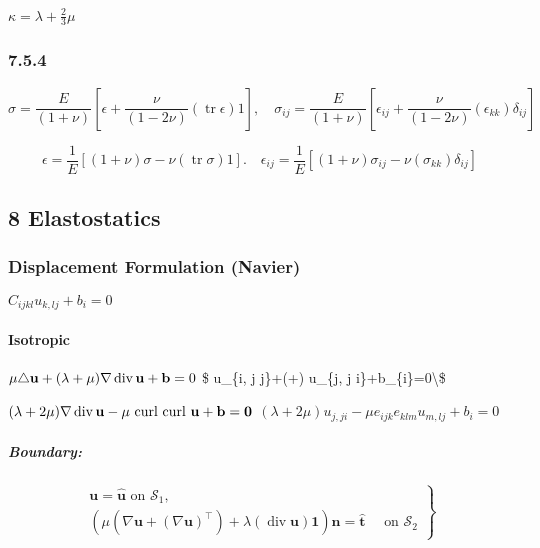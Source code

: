 \(\kappa=\lambda+\frac{2}{3} \mu\)

\hypertarget{section}{%
\subsubsection{7.5.4}\label{section}}

\[
\sigma=\frac{E}{(1+\nu)}\left[\epsilon+\frac{\nu}{(1-2 \nu)}(\operatorname{tr} \epsilon) 1\right], \quad \sigma_{i j}=\frac{E}{(1+\nu)}\left[\epsilon_{i j}+\frac{\nu}{(1-2 \nu)}\left(\epsilon_{k k}\right) \delta_{i j}\right]
\]

\[
\epsilon=\frac{1}{E}[(1+\nu) \sigma-\nu(\operatorname{tr} \sigma) 1] . \quad \epsilon_{i j}=\frac{1}{E}\left[(1+\nu) \sigma_{i j}-\nu\left(\sigma_{k k}\right) \delta_{i j}\right]
\]

\hypertarget{elastostatics}{%
\subsection{8 Elastostatics}\label{elastostatics}}

\hypertarget{displacement-formulation-navier}{%
\subsubsection{Displacement Formulation
(Navier)}\label{displacement-formulation-navier}}

\(C_{i j k l} u_{k, l j}+b_{i}=0\)

\hypertarget{isotropic}{%
\paragraph{Isotropic}\label{isotropic}}

\(\mu \triangle \mathbf{u}+(\lambda+\mu) \nabla \operatorname{div} \mathbf{u}+\mathbf{b}=0\\\)
\$ \mu u\_\{i, j j\}+(\lambda+\mu) u\_\{j, j
i\}+b\_\{i\}=0\textbackslash\$

\((\lambda+2 \mu) \nabla \operatorname{div} \mathbf{u}-\mu \text { curl curl } \mathbf{u}+\mathbf{b}=\mathbf{0}\\\)
\((\lambda+2 \mu) u_{j, j i}-\mu e_{i j k} e_{k l m} u_{m, l j}+b_{i}=0\)

\hypertarget{boundary}{%
\subparagraph{Boundary:}\label{boundary}}

\[\left.\begin{array}{r}{\mathbf{u}=\hat{\mathbf{u}} \text { on } \mathcal{S}_{1},} \\ {\left(\mu\left(\nabla \mathbf{u}+(\nabla \mathbf{u})^{\top}\right)+\lambda(\operatorname{div} \mathbf{u}) \mathbf{1}\right) \mathbf{n}=\hat{\mathbf{t}} \quad \text { on } \mathcal{S}_{2}}\end{array}\right\}\]

